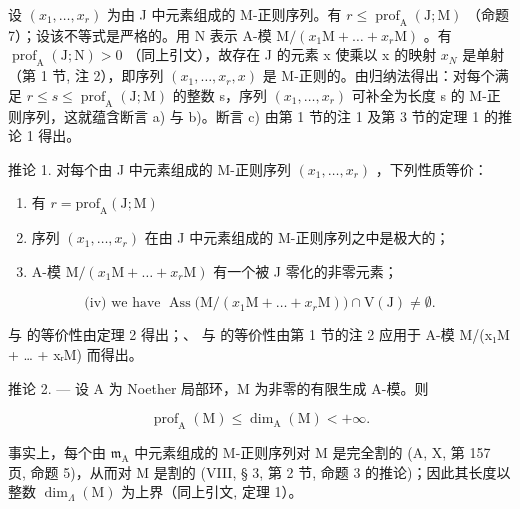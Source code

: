 设 \((x_{1},\ldots,x_{r})\) 为由 J 中元素组成的 M-正则序列。有 \(r\leqslant\operatorname{prof}_{\mathrm{A}}(\mathrm{J};\mathrm{M})\) （命题 7）；设该不等式是严格的。用 N 表示 A-模 \(\mathrm{M}/(x_{1}\mathrm{M}+\ldots+x_{r}\mathrm{M})\) 。有 \(\operatorname{prof}_{\mathrm{A}}(\mathrm{J};\mathrm{N})>0\) （同上引文），故存在 J 的元素 x 使乘以 x 的映射 \(x_{N}\) 是单射（第 1 节, 注 2），即序列 \((x_{1},\ldots,x_{r},x)\) 是 M-正则的。由归纳法得出：对每个满足 \(r\leqslant s\leqslant\operatorname{prof}_{\mathrm{A}}(\mathrm{J};\mathrm{M})\) 的整数 s，序列 \((x_{1},\ldots,x_{r})\) 可补全为长度 s 的 M-正则序列，这就蕴含断言 a) 与 b)。断言 c) 由第 1 节的注 1 及第 3 节的定理 1 的推论 1 得出。

推论 1. 对每个由 J 中元素组成的 M-正则序列 \((x_{1},\ldots ,x_{r})\) ，下列性质等价：

\begin{enumerate}
\def\labelenumi{(\roman{enumi})}
\item
  有 \(r = \mathrm{prof}_{\mathrm{A}}(\mathrm{J};\mathrm{M})\)
\item
  序列 \((x_{1},\ldots,x_{r})\) 在由 J 中元素组成的 M-正则序列之中是极大的；
\item
  A-模 \(\mathrm{M}/(x_{1}\mathrm{M}+\ldots+x_{r}\mathrm{M})\) 有一个被 J 零化的非零元素；
\end{enumerate}

\[
\text {(iv)} \text {   we have   } \operatorname{Ass} \bigl (\mathrm{M} / (x _ {1} \mathrm{M} + \ldots + x _ {r} \mathrm{M}) \bigr) \cap \mathrm{V} (\mathrm{J}) \neq \emptyset .
\]

 与 的等价性由定理 2 得出；、 与 的等价性由第 1 节的注 2 应用于 A-模 M/(x₁M + \ldots{} + xᵣM) 而得出。

推论 2. --- 设 A 为 Noether 局部环，M 为非零的有限生成 A-模。则

\[
\operatorname{prof} _ {\mathrm{A}} (\mathrm{M}) \leqslant \dim_ {\mathrm{A}} (\mathrm{M}) <   + \infty .
\]

事实上，每个由 \(\mathfrak{m}_{\mathrm{A}}\) 中元素组成的 M-正则序列对 M 是完全割的 (A, X, 第 157 页, 命题 5)，从而对 M 是割的 (VIII, § 3, 第 2 节, 命题 3 的推论)；因此其长度以整数 \(\dim_{\Lambda}(\mathrm{M})\) 为上界（同上引文, 定理 1）。


